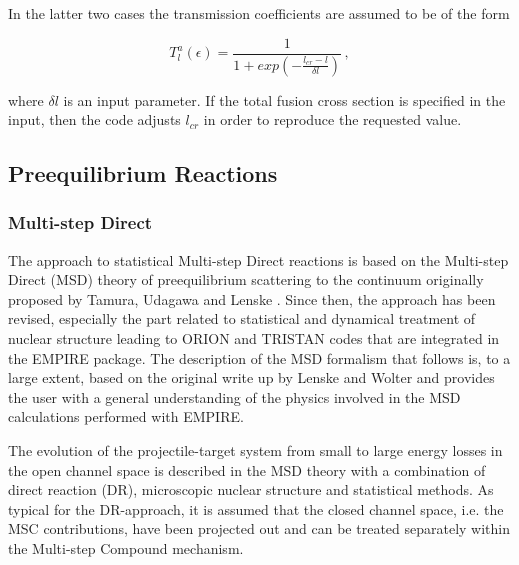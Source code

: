 
In the latter two cases the transmission coefficients are assumed to be of
the form

\begin{equation}
T_{l}^{a}(\epsilon)=\frac{1}{1+exp(-\frac{l_{cr}-l}{\delta l})}\,,
\label{Tlfus}
\end{equation}

\noindent where $\delta l$ is an input parameter. If the total fusion cross
section is specified in the input, then the code adjusts $l_{cr}$ in order
to reproduce the requested value.

\subsection{Preequilibrium Reactions}


\subsubsection{Multi-step Direct\label{sec: MSD}}

The approach to statistical Multi-step Direct%
 reactions is based on the Multi-step Direct (MSD) theory of
preequilibrium scattering to the continuum originally proposed by Tamura,
Udagawa and Lenske \cite{TUL}. Since then, the approach has been revised,
especially the part related to statistical and dynamical treatment of
nuclear structure leading to ORION and TRISTAN codes that are integrated in
the EMPIRE package. The description of the MSD formalism that follows is, to
a large extent, based on the original write up by Lenske and Wolter and
provides the user with a general understanding of the physics involved in
the MSD calculations performed with EMPIRE.

The evolution of the projectile-target system from small to large energy
losses in the open channel space is described in the MSD theory with a
combination of direct reaction (DR), microscopic nuclear structure and
statistical methods. As typical for the DR-approach, it is assumed that the
closed channel space, i.e. the MSC%
 contributions, have been projected out and can be treated
separately within the Multi-step Compound%
 mechanism.

